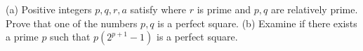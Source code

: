 (a) Positive  integers  $p,q,r,a$  satisfy   where  $r$  is prime  and $p,q$ are  relatively  prime. Prove  that one  of the  numbers  $p,q$ is a  perfect  square.
(b) Examine if there  exists  a  prime  $p$  such that  $p(2^{p+1}-1)$ is a  perfect square.